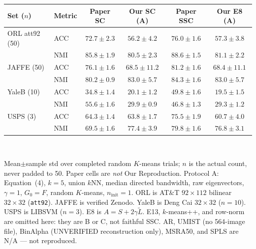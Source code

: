 \setlength{\tabcolsep}{2.6pt}
\begin{tabular}{llcccc}
\toprule
Set ($n$) & Metric & Paper SC & Our SC (A) & Paper SSC & Our E8 (A) \\
\midrule
ORL att92 (50) & ACC & $72.7{\pm}2.3$ & $56.2{\pm}4.2$ & $76.0{\pm}1.6$ & $57.3{\pm}3.8$ \\
               & NMI & $85.8{\pm}1.9$ & $80.5{\pm}2.3$ & $88.6{\pm}1.5$ & $81.1{\pm}2.2$ \\
JAFFE (50) & ACC & $76.1{\pm}1.6$ & $68.5{\pm}11.2$ & $81.2{\pm}1.6$ & $68.4{\pm}11.1$ \\
           & NMI & $80.2{\pm}0.9$ & $83.0{\pm}5.7$ & $84.3{\pm}1.6$ & $83.0{\pm}5.7$ \\
YaleB (10) & ACC & $34.8{\pm}1.4$ & $20.1{\pm}1.2$ & $49.8{\pm}1.6$ & $19.5{\pm}1.5$ \\
           & NMI & $55.6{\pm}1.6$ & $29.9{\pm}0.9$ & $46.8{\pm}1.3$ & $29.3{\pm}1.2$ \\
USPS (3) & ACC & $64.3{\pm}1.4$ & $63.8{\pm}1.7$ & $75.5{\pm}1.9$ & $60.7{\pm}4.0$ \\
         & NMI & $69.5{\pm}1.6$ & $77.4{\pm}3.9$ & $79.8{\pm}1.6$ & $76.8{\pm}3.1$ \\
\bottomrule
\end{tabular}\\[2pt]
{\raggedright\scriptsize
Mean$\pm$sample std over completed random $K$-means trials; $n$ is the actual count, never padded to 50.
Paper cells are \emph{not} Our Reproduction.
Protocol A: Equation~(4), $k{=}5$, union $k$NN, median directed bandwidth, raw eigenvectors, $\gamma{=}1$, $G_0{=}F$, random $K$-means, $n_{\mathrm{init}}{=}1$.
ORL is AT\&T $92{\times}112$ bilinear $32{\times}32$ (\texttt{att92}). JAFFE is verified Zenodo. YaleB is Deng Cai $32{\times}32$ ($n{=}10$). USPS is LIBSVM ($n{=}3$).
E8 is $A=S+2\gamma\widetilde L$. E13, $k$-means++, and row-norm are omitted here: they are B or C, not faithful SSC.
AR, UMIST (no 564-image file), BinAlpha (UNVERIFIED reconstruction only), MSRA50, and SPLS are N/A --- not reproduced.
\par}

